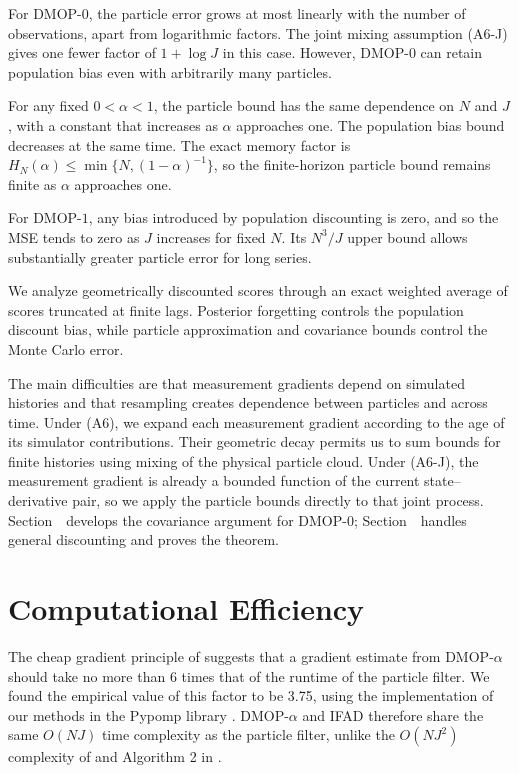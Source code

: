 \documentclass[11pt]{article}
\begin{document}
For DMOP-$0$, the particle error grows at most linearly with the number of observations, apart from logarithmic factors.
The joint mixing assumption (A6-J) gives one fewer factor of $1+\log J$ in this case.
However, DMOP-$0$ can retain population bias even with arbitrarily many particles.

For any fixed $0<\alpha<1$, the particle bound has the same dependence on $N$ and $J$, with a constant that increases as $\alpha$ approaches one.
The population bias bound decreases at the same time.
The exact memory factor is $H_N(\alpha)\leq\min\{N,(1-\alpha)^{-1}\}$, so the finite-horizon particle bound remains finite as $\alpha$ approaches one.

For DMOP-$1$, any bias introduced by population discounting is zero, and so the MSE tends to zero as $J$ increases for fixed $N$.
Its $N^3/J$ upper bound allows substantially greater particle error for long series.


We analyze geometrically discounted scores through an exact weighted average of scores truncated at finite lags.
Posterior forgetting controls the population discount bias, while particle approximation and covariance bounds control the Monte Carlo error.

The main difficulties are that measurement gradients depend on simulated histories and that resampling creates dependence between particles and across time.
Under (A6), we expand each measurement gradient according to the age of its simulator contributions.
Their geometric decay permits us to sum bounds for finite histories using mixing of the physical particle cloud.
Under (A6-J), the measurement gradient is already a bounded function of the current state--derivative pair, so we apply the particle bounds directly to that joint process.
Section~\suppSecProofBiasVar\ develops the covariance argument for DMOP-$0$; Section~\suppSecProofSharperBiasVar\ handles general discounting and proves the theorem.


\section{Computational Efficiency} \label{sec:efficiency}

The cheap gradient principle of \cite{kakade2019provably} suggests that a gradient estimate from DMOP-$\alpha$ should take no more than 6 times that of the runtime of the particle filter.
We found the empirical value of this factor to be 3.75, using the implementation of our methods in the Pypomp library \citep{abkemeier25}.
DMOP-$\alpha$ and IFAD therefore share the same $O(NJ)$ time complexity as the particle filter, unlike the $O(NJ^2)$ complexity of \cite{corenflos21} and Algorithm 2 in \citep{poyiadjis11, scibior21}.
\end{document}
